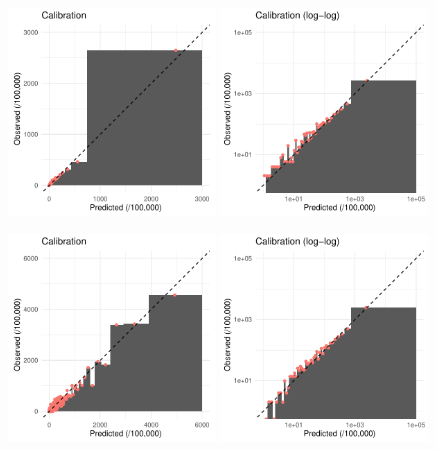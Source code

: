 \documentclass[12pt]{article}
\begin{document}
\begin{figure}[h]
\centering
\includegraphics[width=0.49\textwidth]{figures/calibration50_bar_zoom.pdf}
\includegraphics[width=0.49\textwidth]{figures/calibration50_bar_log.pdf}
\end{figure}

\begin{figure}[h]
\centering
\includegraphics[width=0.49\textwidth]{figures/calibration1000_bar_zoom.pdf}
\includegraphics[width=0.49\textwidth]{figures/calibration1000_bar_log.pdf}
\end{figure}
\end{document}
